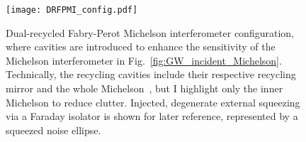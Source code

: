 

\begin{figure}[t]
	\centering
	\texttt{[image: DRFPMI\_config.pdf]}
	\caption{Dual-recycled Fabry-Perot Michelson interferometer configuration, where cavities are introduced to enhance the sensitivity of the Michelson interferometer in Fig.~\ref{fig:GW_incident_Michelson}. Technically, the recycling cavities include their respective recycling mirror and the whole Michelson~\cite{meersRecyclingLaserinterferometricGravitationalwave1988,1995AuJPh..48..953M}, but I highlight only the inner Michelson to reduce clutter. Injected, degenerate external squeezing via a Faraday isolator is shown for later reference, represented by a squeezed noise ellipse.}
	\label{fig:DRFPMI}
\end{figure}

